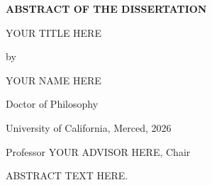\documentclass[12pt, oneside]{report}
\begin{document}
\begin{singlespacing}
    \begin{center}
        {\bfseries ABSTRACT OF THE DISSERTATION \par}
        \vspace{0.2in}
        {YOUR TITLE HERE \par}
        \vspace{0.2in}
        {by \par}
        \vspace{0.2in}
        {YOUR NAME HERE \par}
        \vspace{0.2in}
        {Doctor of Philosophy \par}
        {University of California, Merced, 2026 \par}
        {Professor YOUR ADVISOR HERE, Chair \par}
    \end{center}

    \vspace{0.4in}

    \setlength{\parindent}{0.5in}
    
    ABSTRACT TEXT HERE. 

\end{singlespacing}

\restoregeometry %
\clearpage


\pagestyle{mainbody} %



% 
% 
% 
% 

\newpage
\begin{appendices}
    \singlespacing %
     
\end{appendices}

\newpage
{}
\printbibliography
\end{document}
